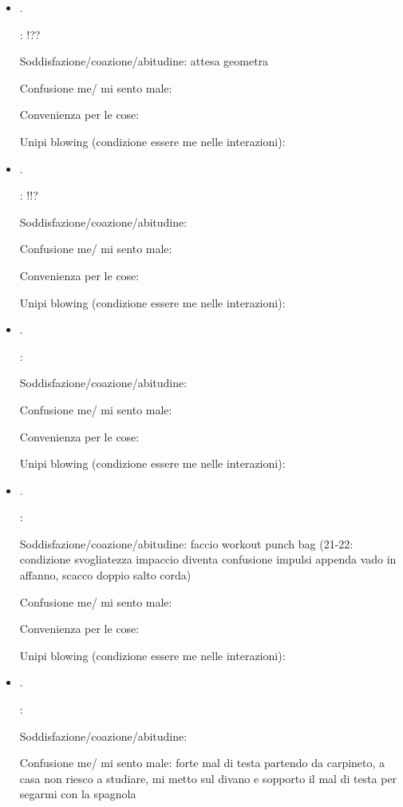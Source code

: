 \begin{itemize}
\item {}.

: !??

Soddisfazione/coazione/abitudine: attesa geometra

Confusione me/ mi sento male:

Convenienza per le cose:

Unipi blowing (condizione essere me nelle interazioni):

\item {}.

: !!?

Soddisfazione/coazione/abitudine:

Confusione me/ mi sento male:

Convenienza per le cose:

Unipi blowing (condizione essere me nelle interazioni):

\item {}.

:

Soddisfazione/coazione/abitudine: 

Confusione me/ mi sento male:

Convenienza per le cose:

Unipi blowing (condizione essere me nelle interazioni):

\item {}.

:

Soddisfazione/coazione/abitudine: faccio workout punch bag (21-22: condizione svogliatezza impaccio diventa confusione impulsi appenda vado in affanno, scacco doppio salto corda)

Confusione me/ mi sento male:

Convenienza per le cose:

Unipi blowing (condizione essere me nelle interazioni):

\item {}.

:

Soddisfazione/coazione/abitudine: 

Confusione me/ mi sento male: forte mal di testa partendo da carpineto, a casa non riesco a studiare, mi metto sul divano e sopporto il mal di testa per segarmi con la spagnola


\end{itemize}
